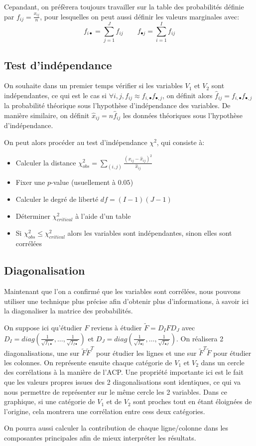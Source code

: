 Cepandant, on préfèrera toujours travailler sur la table des probabilités définie par $f_{ij} = \frac{x_{ij}}{n}$, pour lesquelles on peut aussi définir les valeurs marginales avec: 
\begin{equation}
  f_{i\bullet} = \sum_{j=1}^J f_{ij} \qquad
  f_{\bullet j} = \sum_{i=1}^I f_{ij}
\end{equation}

\subsection{Test d'indépendance}

On souhaite dans un premier temps vérifier si les variables $V_1$ et $V_2$ sont indépendantes, ce qui est le cas si $\forall i, j, f_{ij} \approx f_{i,\bullet}f_{\bullet, j}$, on définit alors $\hat{f}_{ij} = f_{i,\bullet}f_{\bullet, j}$ la probabilité théorique sous l'hypothèse d'indépendance des variables. 
De manière similaire, on définit $\hat{x}_{ij} = n\hat{f}_{ij}$ les données théoriques sous l'hypothèse d'indépendance. 

On peut alors procéder au test d'indépendance $\chi^2$, qui consiste à:
\begin{itemize}
  \item Calculer la distance $\chi_{obs}^2 = \sum_{(i,j)} \frac{(x_{ij} - \hat{x}_{ij})^2}{\hat{x}_{ij}}$ 
  \item Fixer une $p$-value (usuellement à $0.05$)
  \item Calculer le degré de liberté $df = (I - 1)(J - 1)$ 
  \item Déterminer $\chi_{critical}^2$ à l'aide d'un table 
  \item Si $\chi_{obs}^2 \leq \chi_{critical}^2$ alors les variables sont indépendantes, sinon elles sont corrélées
\end{itemize}

\subsection{Diagonalisation}

Maintenant que l'on a confirmé que les variables sont corrélées, nous pouvons utiliser une technique plus précise afin d'obtenir plus d'informations, à savoir ici la diagonaliser la matrice des probabilités.

On suppose ici qu'étudier $F$ reviens à étudier $\tilde{F} = D_IFD_J$ avec $D_I = diag(\frac{1}{\sqrt{f_{1 \bullet}}}, \dots, \frac{1}{\sqrt{f_{I\bullet}}})$ et $D_J = diag(\frac{1}{\sqrt{f_{\bullet 1}}}, \dots, \frac{1}{\sqrt{f_{\bullet J}}})$.
On réalisera 2 diagonalisations, une sur $\tilde{F}\tilde{F}^T$ pour étudier les lignes et une sur $\tilde{F}^T\tilde{F}$ pour étudier les colonnes.
On représente ensuite chaque catégorie de $V_1$ et $V_2$ dans un cercle des corrélations à la manière de l'ACP.
Une propriété importante ici est le fait que les valeurs propres issues des 2 diagonalisations sont identiques, ce qui va nous permettre de représenter sur le même cercle les 2 variables. Dans ce graphique, si une catégorie de $V_1$ et de $V_2$ sont proches tout en étant éloignées de l'origine, cela montrera une corrélation entre cess deux catégories.

On pourra aussi calculer la contribution de chaque ligne/colonne dans les composantes principales afin de mieux interpréter les résultats.
